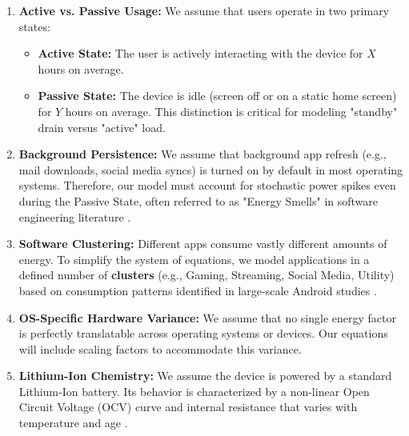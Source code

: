\documentclass[12pt]{article}
\begin{document}
\begin{enumerate}
    \item \textbf{Active vs. Passive Usage:} We assume that users operate in two primary states:
    \begin{itemize}
        \item \textbf{Active State:} The user is actively interacting with the device for $X$ hours on average.
        \item \textbf{Passive State:} The device is idle (screen off or on a static home screen) for $Y$ hours on average. This distinction is critical for modeling "standby" drain versus "active" load.
    \end{itemize}
    
    \item \textbf{Background Persistence:} We assume that background app refresh (e.g., mail downloads, social media syncs) is turned on by default in most operating systems. Therefore, our model must account for stochastic power spikes even during the Passive State, often referred to as "Energy Smells" in software engineering literature \cite{10}.
    
    \item \textbf{Software Clustering:} Different apps consume vastly different amounts of energy. To simplify the system of equations, we model applications in a defined number of \textbf{clusters} (e.g., Gaming, Streaming, Social Media, Utility) based on consumption patterns identified in large-scale Android studies \cite{12}.
    
    \item \textbf{OS-Specific Hardware Variance:} We assume that no single energy factor is perfectly translatable across operating systems or devices. Our equations will include scaling factors to accommodate this variance.
    
    \item \textbf{Lithium-Ion Chemistry:} We assume the device is powered by a standard Lithium-Ion battery. Its behavior is characterized by a non-linear Open Circuit Voltage (OCV) curve and internal resistance that varies with temperature and age \cite{6}.
\end{enumerate}

\newpage

\end{document}
